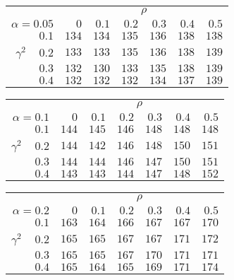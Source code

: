 \begin{tabular}{r|rrrrrr}
\hline\hline
 &\multicolumn{6}{c}{$\rho$} \\ 
 $\alpha = 0.05$ & $0$ & $0.1$ & $0.2$ & $0.3$ & $0.4$ & $0.5$ \\ 
 \hline$0.1$ & $134$ & $134$ & $135$ & $136$ & $138$ & $138$\\ 
$\gamma^2\;\;\;$ $0.2$ & $133$ & $133$ & $135$ & $136$ & $138$ & $139$\\ 
$0.3$ & $132$ & $130$ & $133$ & $135$ & $138$ & $139$\\ 
$0.4$ & $132$ & $132$ & $132$ & $134$ & $137$ & $139$\\ 
 \hline 
 \end{tabular}
 
 \vspace{2em} 
 
\begin{tabular}{r|rrrrrr}
\hline\hline
 &\multicolumn{6}{c}{$\rho$} \\ 
 $\alpha = 0.1$ & $0$ & $0.1$ & $0.2$ & $0.3$ & $0.4$ & $0.5$ \\ 
 \hline$0.1$ & $144$ & $145$ & $146$ & $148$ & $148$ & $148$\\ 
$\gamma^2\;\;\;$ $0.2$ & $144$ & $142$ & $146$ & $148$ & $150$ & $151$\\ 
$0.3$ & $144$ & $144$ & $146$ & $147$ & $150$ & $151$\\ 
$0.4$ & $143$ & $143$ & $144$ & $147$ & $148$ & $152$\\ 
 \hline 
 \end{tabular}
 
 \vspace{2em} 
 
\begin{tabular}{r|rrrrrr}
\hline\hline
 &\multicolumn{6}{c}{$\rho$} \\ 
 $\alpha = 0.2$ & $0$ & $0.1$ & $0.2$ & $0.3$ & $0.4$ & $0.5$ \\ 
 \hline$0.1$ & $163$ & $164$ & $166$ & $167$ & $167$ & $170$\\ 
$\gamma^2\;\;\;$ $0.2$ & $165$ & $165$ & $167$ & $167$ & $171$ & $172$\\ 
$0.3$ & $165$ & $165$ & $167$ & $170$ & $171$ & $171$\\ 
$0.4$ & $165$ & $164$ & $165$ & $169$ & $171$ & $174$\\ 
 \hline 
 \end{tabular}